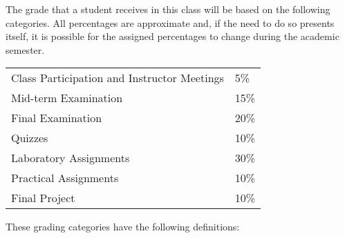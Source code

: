 The grade that a student receives in this class will be based on the following categories. All percentages are
approximate and, if the need to do so presents itself, it is possible for the assigned percentages to change during the
academic semester. 

\begin{center}
  \begin{tabular}{ll}
    Class Participation and Instructor Meetings & 5\% \\
    Mid-term Examination                        & 15\% \\
    Final Examination                           & 20\% \\
    Quizzes                                     & 10\% \\
    Laboratory Assignments                      & 30\% \\
    Practical Assignments                       & 10\% \\
    Final Project                               & 10\%
  \end{tabular}
\end{center}

\noindent
These grading categories have the following definitions:
\vspace*{-.1in}

